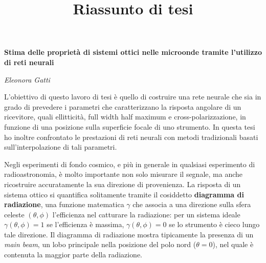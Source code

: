 \documentclass[12pt,a4paper,final]{report}			%
\title{Riassunto di tesi}
\begin{document}
\begin{center}
	\LARGE \textbf{Stima delle proprietà di sistemi ottici nelle microonde tramite l'utilizzo di reti neurali}
\end{center}
\begin{center}
	\normalsize \textit{Eleonora Gatti}
\end{center}

\vspace{5mm}


L’obiettivo di questo lavoro di tesi è quello di costruire una rete neurale che sia in grado di prevedere i parametri che caratterizzano la risposta angolare di un ricevitore, quali ellitticità, full width half maximum e cross-polarizzazione, in funzione di una posizione sulla superficie focale di uno strumento. In questa tesi ho inoltre confrontato le prestazioni di reti neurali con metodi tradizionali basati sull'interpolazione di tali parametri.

Negli esperimenti di fondo cosmico, e più in generale in qualsiasi esperimento di radioastronomia, è molto importante non solo misurare il segnale, ma anche ricostruire accuratamente la sua direzione di provenienza. La risposta di un sistema ottico si quantifica solitamente tramite il cosiddetto \textbf{diagramma di radiazione}, una funzione matematica $\gamma$ che associa a una direzione sulla sfera celeste $(\theta, \phi)$ l'efficienza nel catturare la radiazione: per un sistema ideale $\gamma(\theta, \phi) = 1$ se l'efficienza è massima, $\gamma(\theta, \phi) = 0$ se lo strumento è cieco lungo tale direzione. Il diagramma di radiazione mostra tipicamente la presenza di un \textit{main beam}, un lobo principale nella posizione del polo nord ($\theta = 0$), nel quale è contenuta la maggior parte della radiazione.
\end{document}
